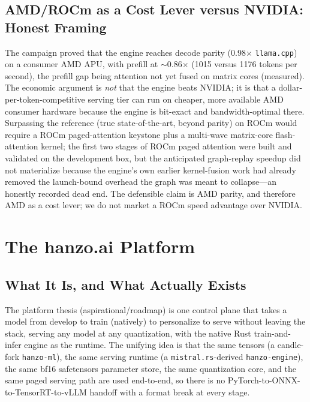 \documentclass[11pt]{article}
\begin{document}
\subsection{AMD/ROCm as a Cost Lever versus NVIDIA: Honest Framing}

The campaign proved that the engine reaches decode parity (0.98$\times$ \texttt{llama.cpp}) on a consumer AMD APU, with prefill at $\sim$0.86$\times$ (1015 versus 1176 tokens per second), the prefill gap being attention not yet fused on matrix cores (measured). The economic argument is \emph{not} that the engine beats NVIDIA; it is that a dollar-per-token-competitive serving tier can run on cheaper, more available AMD consumer hardware because the engine is bit-exact and bandwidth-optimal there. Surpassing the reference (true state-of-the-art, beyond parity) on ROCm would require a ROCm paged-attention keystone plus a multi-wave matrix-core flash-attention kernel; the first two stages of ROCm paged attention were built and validated on the development box, but the anticipated graph-replay speedup did not materialize because the engine's own earlier kernel-fusion work had already removed the launch-bound overhead the graph was meant to collapse---an honestly recorded dead end. The defensible claim is AMD parity, and therefore AMD as a cost lever; we do not market a ROCm speed advantage over NVIDIA.

\section{The hanzo.ai Platform}
\label{sec:platform}

\subsection{What It Is, and What Actually Exists}

The platform thesis (aspirational/roadmap) is one control plane that takes a model from develop to train (natively) to personalize to serve without leaving the stack, serving any model at any quantization, with the native Rust train-and-infer engine as the runtime. The unifying idea is that the same tensors (a candle-fork \texttt{hanzo-ml}), the same serving runtime (a \texttt{mistral.rs}-derived \texttt{hanzo-engine}), the same bf16 safetensors parameter store, the same quantization core, and the same paged serving path are used end-to-end, so there is no PyTorch-to-ONNX-to-TensorRT-to-vLLM handoff with a format break at every stage.
\end{document}
